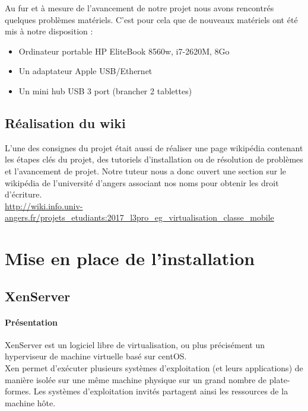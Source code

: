\documentclass[a4paper,12pt]{extarticle}
\begin{document}
Au fur et à mesure de l’avancement de notre projet nous avons rencontrés quelques problèmes matériels. C’est pour cela que de nouveaux matériels ont été mis à notre disposition :
\begin{itemize}
\item Ordinateur portable HP EliteBook 8560w, i7-2620M, 8Go
\item Un adaptateur Apple USB/Ethernet
\item Un mini hub USB 3 port (brancher 2 tablettes)
\end{itemize}

\clearpage

\subsection{Réalisation du wiki}

L’une des consignes du projet était aussi de réaliser une page wikipédia contenant les étapes clés du projet, des tutoriels d’installation ou de résolution de problèmes et l’avancement de projet.\newline
Notre tuteur nous a donc ouvert une section sur le wikipédia de l’université d’angers associant nos noms pour obtenir les droit d’écriture.\\

\url{http://wiki.info.univ-angers.fr/projets_etudiants:2017_l3pro_eg_virtualisation_classe_mobile}

\clearpage

\section{Mise en place de l'installation}
\subsection{XenServer}
\paragraph{Présentation\\}


XenServer est un logiciel libre de virtualisation, ou plus précisément un hyperviseur de machine virtuelle basé sur centOS.\\

Xen permet d'exécuter plusieurs systèmes d'exploitation (et leurs applications) de manière isolée sur une même machine physique sur un grand nombre de plate-formes. Les systèmes d'exploitation invités partagent ainsi les ressources de la machine hôte.\\
\end{document}
